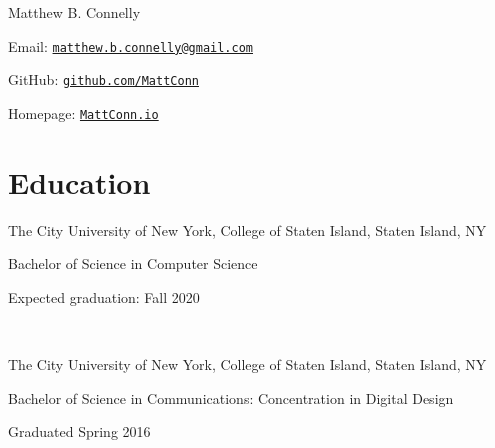 \documentclass[letterpaper]{article}
\def\name{Matthew B. Connelly}
\renewenvironment{itemize}{
  \begin{list}{}{
    \setlength{\leftmargin}{1.5em}
  }
}{
  \end{list}
}
\begin{document}

\centerline{\huge \name}

\vspace{0.25in}

\begin{itemize}
  \item Email: \href{mailto:matthew.b.connelly@gmail.com}{\tt matthew.b.connelly@gmail.com}

  GitHub: \href{https://github.com/mattconn/}{\tt github.com/MattConn}

  Homepage: \href{http://mattconn.io/}{\tt MattConn.io}
\end{itemize}


\section*{Education}

\begin{itemize}
  \item The City University of New York, College of Staten Island, Staten Island, NY

  Bachelor of Science in Computer Science

  Expected graduation: Fall 2020

  \

  \item The City University of New York, College of Staten Island, Staten Island, NY

  Bachelor of Science in Communications: Concentration in Digital Design

  Graduated Spring 2016
\end{itemize}
\end{document}
